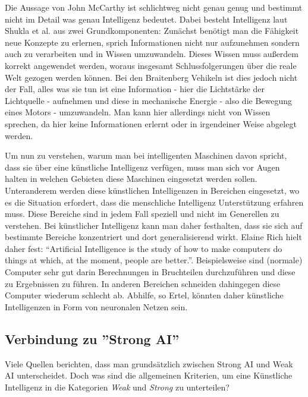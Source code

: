             Die Aussage von John McCarthy ist schlichtweg nicht genau genug und bestimmt nicht im Detail was
            genau Intelligenz bedeutet. Dabei besteht Intelligenz laut Shukla et al. aus zwei Grundkomponenten:
            Zunächst benötigt man die Fähigkeit neue Konzepte zu erlernen, sprich Informationen nicht nur
            aufzunehmen sondern auch zu verarbeiten und in Wissen umzuwandeln. Dieses Wissen muss außerdem
            korrekt angewendet werden, woraus insgesamt Schlussfolgerungen über die reale Welt gezogen werden
            können. \cite{shukla2013applicability} Bei den Braitenberg Vehikeln ist dies jedoch nicht der Fall,
            alles was sie tun ist eine Information - hier die Lichtstärke der Lichtquelle - aufnehmen und diese
            in mechanische Energie - also die Bewegung eines Motors - umzuwandeln. Man kann hier allerdings nicht
            von Wissen sprechen, da hier keine Informationen erlernt oder in irgendeiner Weise abgelegt werden.

            Um nun zu verstehen, warum man bei intelligenten Maschinen davon spricht, dass sie über eine
            künstliche Intelligenz verfügen, muss man sich vor Augen halten in welchen Gebieten diese Maschinen
            eingesetzt werden sollen. Unteranderem werden diese künstlichen Intelligenzen in Bereichen eingesetzt,
            wo es die Situation erfordert, dass die menschliche Intelligenz Unterstützung erfahren muss.\cite[p. 2]{ertel2016grundkurs}
            Diese Bereiche sind in jedem Fall speziell und nicht im Generellen zu verstehen. Bei künstlicher
            Intelligenz kann man daher festhalten, dass sie sich auf bestimmte Bereiche konzentriert und dort
            generalisierend wirkt. Elaine Rich hielt daher fest: ``Artificial Intelligence is the study of how
            to make computers do things at which, at the moment, people are better.''. Beispielsweise sind (normale)
            Computer sehr gut darin Berechnungen in Bruchteilen durchzuführen und diese zu Ergebnissen zu führen.\cite[p. 3]{ertel2016grundkurs}
            In anderen Bereichen schneiden dahingegen diese Computer wiederum schlecht ab. Abhilfe, so Ertel,
            könnten daher künstliche Intelligenzen in Form von neuronalen Netzen sein.

        \subsection{Verbindung zu ''Strong AI''}
            Viele Quellen berichten, dass man grundsätzlich zwischen Strong AI und Weak AI unterscheidet.\cite{huang_beef}
            Doch was sind die allgemeinen Kriterien, um eine Künstliche Intelligenz in die Kategorien \textit{Weak}
            und \textit{Strong} zu unterteilen?


